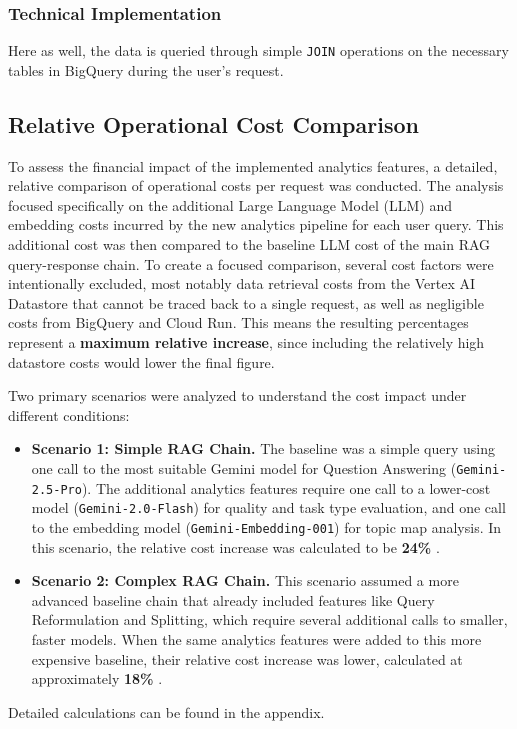 \documentclass[
	english,
	ruledheaders=section,%
	class=report,%
	thesis={type=bachelor},%
	accentcolor=1b,%
	custommargins=true,%
	marginpar=false,%
	parskip=half-,%
	fontsize=11pt,%
	DIV=14,
]{tudapub}
\begin{document}
\subsubsection{Technical Implementation}
Here as well, the data is queried through simple \texttt{JOIN} operations on the necessary tables in BigQuery during the user's request.

\subsection{Relative Operational Cost Comparison}
To assess the financial impact of the implemented analytics features, a detailed, relative comparison of operational costs per request was conducted. The analysis focused specifically on the additional Large Language Model (LLM) and embedding costs incurred by the new analytics pipeline for each user query. This additional cost was then compared to the baseline LLM cost of the main RAG query-response chain. To create a focused comparison, several cost factors were intentionally excluded, most notably data retrieval costs from the Vertex AI Datastore that cannot be traced back to a single request, as well as negligible costs from BigQuery and Cloud Run. This means the resulting percentages represent a \textbf{maximum relative increase}, since including the relatively high datastore costs would lower the final figure.

Two primary scenarios were analyzed to understand the cost impact under different conditions:

\begin{itemize}
    \item \textbf{Scenario 1: Simple RAG Chain.} The baseline was a simple query using one call to the most suitable Gemini model for Question Answering (\texttt{Gemini-2.5-Pro}). The additional analytics features require one call to a lower-cost model (\texttt{Gemini-2.0-Flash}) for quality and task type evaluation, and one call to the embedding model (\texttt{Gemini-Embedding-001}) for topic map analysis. In this scenario, the relative cost increase was calculated to be \textbf{24\%} \parencite{GoogleGeminiPricing}.

    \item \textbf{Scenario 2: Complex RAG Chain.} This scenario assumed a more advanced baseline chain that already included features like Query Reformulation and Splitting, which require several additional calls to smaller, faster models. When the same analytics features were added to this more expensive baseline, their relative cost increase was lower, calculated at approximately \textbf{18\%} \parencite{GoogleGeminiPricing}.
\end{itemize}
Detailed calculations can be found in the appendix.
\end{document}
